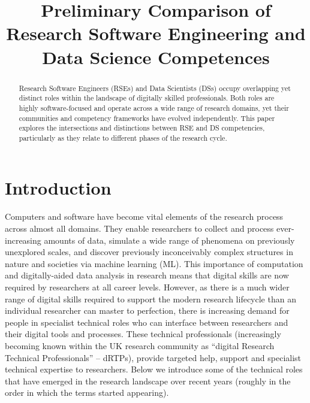 \documentclass[
        english,biblatex
    ]{lni}
\begin{document}
        \title[]{Preliminary Comparison of Research Software Engineering
and Data Science Competences}
    
    
    

    \maketitle

        \begin{abstract}
        Research Software Engineers (RSEs) and Data Scientists (DSs)
        occupy overlapping yet distinct roles within the landscape of
        digitally skilled professionals. Both roles are highly
        software-focused and operate across a wide range of research
        domains, yet their communities and competency frameworks have
        evolved independently. This paper explores the intersections and
        distinctions between RSE and DS competencies, particularly as
        they relate to different phases of the research cycle.
    \end{abstract}
    
    
    \section{Introduction}\label{introduction}

    Computers and software have become vital elements of the research
    process across almost all domains. They enable researchers to
    collect and process ever-increasing amounts of data, simulate a wide
    range of phenomena on previously unexplored scales, and discover
    previously inconceivably complex structures in nature and societies
    via machine learning (ML). This importance of computation and
    digitally-aided data analysis in research means that digital skills
    are now required by researchers at all career levels. However, as
    there is a much wider range of digital skills required to support
    the modern research lifecycle than an individual researcher can
    master to perfection, there is increasing demand for people in
    specialist technical roles who can interface between researchers and
    their digital tools and processes. These technical professionals
    (increasingly becoming known within the UK research community as
    ``digital Research Technical Professionals'' -- dRTPs), provide
    targeted help, support and specialist technical expertise to
    researchers. Below we introduce some of the technical roles that
    have emerged in the research landscape over recent years (roughly in
    the order in which the terms started appearing).
\end{document}
